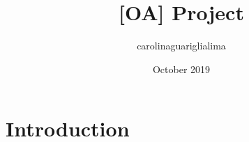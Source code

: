 \documentclass{article}
\title{[OA] Project}
\author{carolinaguariglialima }
\date{October 2019}
\begin{document}
\maketitle

\section{Introduction}
\end{document}
